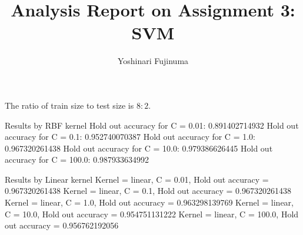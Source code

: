\documentclass[11pt]{article}
\begin{document}
\vspace{-1cm}
\title{\vspace{-2ex}Analysis Report on Assignment 3: SVM\vspace{-2ex}}
\author{Yoshinari Fujinuma\vspace{-2ex}}
\date{\vspace{-2ex}}
\maketitle

The ratio of train size to test size is $8:2$.

Results by RBF kernel
Hold out accuracy for C = 0.01: 0.891402714932
Hold out accuracy for C = 0.1: 0.952740070387
Hold out accuracy for C = 1.0: 0.967320261438
Hold out accuracy for C = 10.0: 0.979386626445
Hold out accuracy for C = 100.0: 0.987933634992


Results by Linear kernel
Kernel = linear, C = 0.01, Hold out accuracy = 0.967320261438
Kernel = linear, C = 0.1, Hold out accuracy = 0.967320261438
Kernel = linear, C = 1.0, Hold out accuracy = 0.963298139769
Kernel = linear, C = 10.0, Hold out accuracy = 0.954751131222
Kernel = linear, C = 100.0, Hold out accuracy = 0.956762192056
\end{document}
